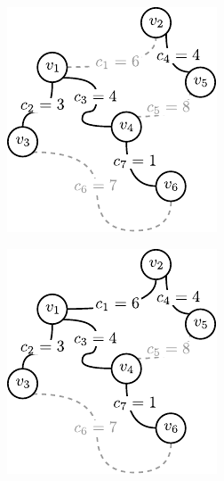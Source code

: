 \begin{figure}[!htbp]
\begin{subfigure}[b]{0.19\textwidth}
		\caption{}
		\label{fig:kruskal:d}
	\end{subfigure}
	\hfill
	\hspace{3pt}
	\begin{subfigure}[b]{0.19\textwidth}
		\includegraphics[width=\textwidth]{Chapter_I/KRUSKAL-example/e}
		\caption{}
		\label{fig:kruskal:e}
	\end{subfigure}
	\hfill
	\begin{subfigure}[b]{0.19\textwidth}
		\includegraphics[width=\textwidth]{Chapter_I/KRUSKAL-example/f}

\end{subfigure}
\end{figure}
